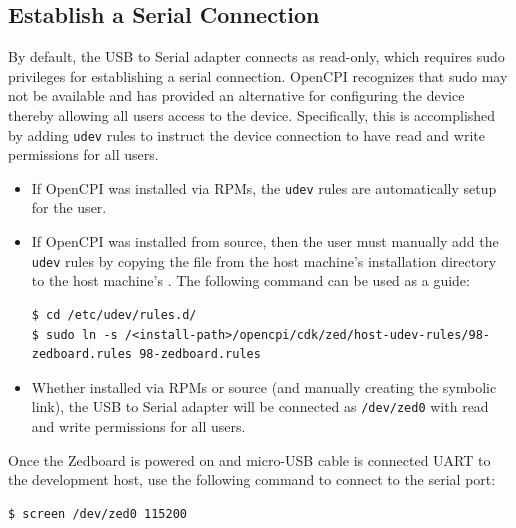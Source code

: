 \subsection{Establish a Serial Connection}
By default, the USB to Serial adapter connects as read-only, which requires sudo privileges for establishing a serial connection. OpenCPI recognizes that sudo may not be available and has provided an alternative for configuring the device thereby allowing all users access to the device. Specifically, this is accomplished by adding \texttt{udev} rules to instruct the device connection to have read and write permissions for all users.
\begin{itemize}
\item If OpenCPI was installed via RPMs, the \texttt{udev} rules are automatically setup for the user.
\item If OpenCPI was installed from source, then the user must manually add the \texttt{udev} rules by copying the file from the host machine's installation directory to the host machine's . The following command can be used as a guide:
\begin{verbatim}
$ cd /etc/udev/rules.d/
$ sudo ln -s /<install-path>/opencpi/cdk/zed/host-udev-rules/98-zedboard.rules 98-zedboard.rules
\end{verbatim}
\item Whether installed via RPMs or source (and manually creating the symbolic link), the USB to Serial adapter will be connected as \texttt{/dev/zed0} with read and write permissions for all users.
\end{itemize}

\noindent Once the Zedboard is powered on and micro-USB cable is connected UART to the development host, use the following command to connect to the serial port:
\begin{verbatim}
$ screen /dev/zed0 115200
\end{verbatim}
\medskip

